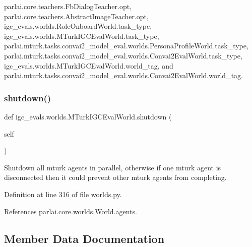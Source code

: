 parlai.\+core.\+teachers.\+Fb\+Dialog\+Teacher.\+opt, parlai.\+core.\+teachers.\+Abstract\+Image\+Teacher.\+opt, igc\+\_\+evals.\+worlds.\+Role\+Onboard\+World.\+task\+\_\+type, igc\+\_\+evals.\+worlds.\+M\+Turk\+I\+G\+C\+Eval\+World.\+task\+\_\+type, parlai.\+mturk.\+tasks.\+convai2\+\_\+model\+\_\+eval.\+worlds.\+Persona\+Profile\+World.\+task\+\_\+type, parlai.\+mturk.\+tasks.\+convai2\+\_\+model\+\_\+eval.\+worlds.\+Convai2\+Eval\+World.\+task\+\_\+type, igc\+\_\+evals.\+worlds.\+M\+Turk\+I\+G\+C\+Eval\+World.\+world\+\_\+tag, and parlai.\+mturk.\+tasks.\+convai2\+\_\+model\+\_\+eval.\+worlds.\+Convai2\+Eval\+World.\+world\+\_\+tag.

\mbox{\label{classigc__evals_1_1worlds_1_1MTurkIGCEvalWorld_a8598b24c39425e921c38ef45fb1f7e95}} 
\subsubsection{\texorpdfstring{shutdown()}{shutdown()}}
{\footnotesize\ttfamily def igc\+\_\+evals.\+worlds.\+M\+Turk\+I\+G\+C\+Eval\+World.\+shutdown (\begin{DoxyParamCaption}\item[{}]{self }\end{DoxyParamCaption})}

\begin{DoxyVerb}Shutdown all mturk agents in parallel, otherwise if one mturk agent
is disconnected then it could prevent other mturk agents from
completing.
\end{DoxyVerb}
 

Definition at line 316 of file worlds.\+py.



References parlai.\+core.\+worlds.\+World.\+agents.



\subsection{Member Data Documentation}
\mbox{\label{classigc__evals_1_1worlds_1_1MTurkIGCEvalWorld_a2d85992a36e835c15f629b2ad0cd098d}} 
